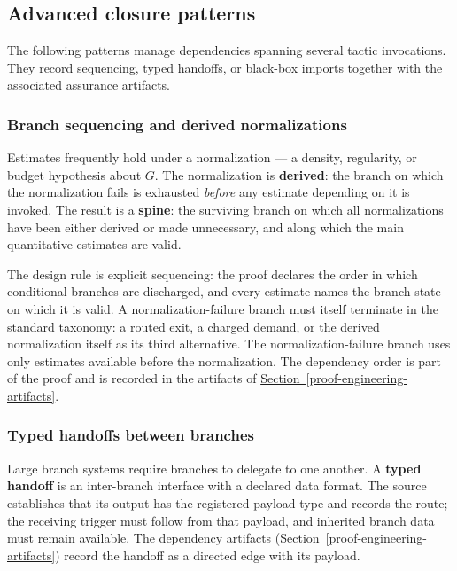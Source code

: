 \documentclass[
  11pt,
]{article}
\theoremstyle{definition}
\newcommand{\secref}[1]{\hyperref[#1]{Section~\ref*{#1}}}
\begin{document}
\subsection{Advanced closure
patterns}\label{advanced-closure-patterns}

The following patterns manage dependencies spanning several tactic
invocations. They record sequencing, typed handoffs, or black-box
imports together with the associated assurance artifacts.

\subsubsection{Branch sequencing and derived
normalizations}\label{branch-sequencing-and-derived-normalizations}

Estimates frequently hold under a normalization --- a density,
regularity, or budget hypothesis about \(G\). The normalization is
\textbf{derived}: the branch on which the normalization fails is
exhausted \emph{before} any estimate depending on it is invoked. The
result is a \textbf{spine}: the surviving branch on which all
normalizations have been either derived or made unnecessary, and along
which the main quantitative estimates are valid.

The design rule is explicit sequencing: the proof declares the order in
which conditional branches are discharged, and every estimate names the
branch state on which it is valid. A normalization-failure branch must
itself terminate in the standard taxonomy: a routed exit, a charged
demand, or the derived normalization itself as its third alternative.
The normalization-failure branch uses only
estimates available before the normalization. The dependency order is
part of the proof and is recorded in the artifacts of \secref{proof-engineering-artifacts}.

\subsubsection{Typed handoffs between
branches}\label{typed-handoffs-between-branches}

Large branch systems require branches to delegate to one another. A
\textbf{typed handoff} is an inter-branch interface with a declared data
format. The source establishes that its output has the registered
payload type and records the route; the receiving trigger must follow
from that payload, and inherited branch data must remain available. The
dependency artifacts (\secref{proof-engineering-artifacts}) record the handoff as a directed
edge with its payload.
\end{document}
